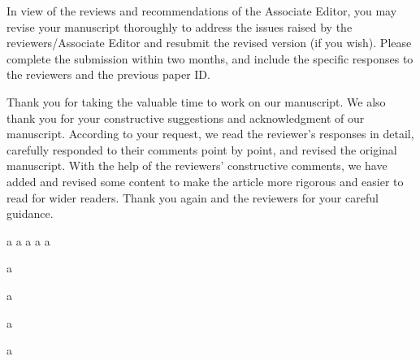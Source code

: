 
\editor

\begin{generalcomment}
In view of the reviews and recommendations of the Associate Editor, you may revise your manuscript thoroughly to address the issues raised by the reviewers/Associate Editor and resubmit the revised version (if you wish). Please complete the submission within two months, and include the specific responses to the reviewers and the previous paper ID.
\end{generalcomment}
\begin{revmeta}[]
Thank you for taking the valuable time to work on our manuscript. We also thank you for your constructive suggestions and acknowledgment of our manuscript. According to your request, we read the reviewer's responses in detail, carefully responded to their comments point by point, and revised the original manuscript. With the help of the reviewers' constructive comments, we have added and revised some content to make the article more rigorous and easier to read for wider readers. Thank you again and the reviewers for your careful guidance.


a
a
a
a
a

a

a

a\cite{wu2020comprehensive,zhang2023survey,li2021low}

a



\end{revmeta}




\markboth{}{}
\printbibliography[heading=bibintoc, heading=bibliography, title={References}, section=\therefsection]
\markboth{}{}

